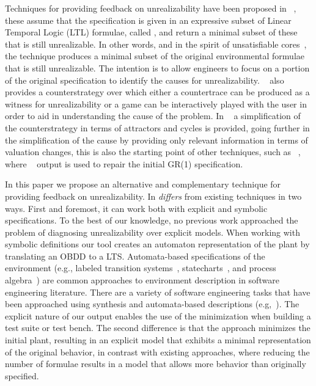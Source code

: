 Techniques for providing feedback on unrealizability have been proposed in ~\cite{DBLP:conf/fmcad/KonighoferHB09, DBLP:journals/scp/Schuppan12,DBLP:conf/fmcad/AlurMT13},
these assume that the specification is given in an expressive subset of Linear Temporal Logic (LTL) formulae, called \gr, and return a minimal subset of these that is still unrealizable. In other words, and in the spirit of unsatisfiable cores~\cite{Torlak:2008}, the technique produces a minimal subset of the original environmental formulae that is still unrealizable. The intention is to allow engineers to focus on a portion of the original specification to identify the causes for unrealizability. ~\cite{DBLP:conf/fmcad/KonighoferHB09} also provides a counterstrategy over which either a countertrace can be produced as a witness for unrealizability or a game can be interactively played with the user in order to aid in understanding the cause of the problem. In ~\cite{DBLP:conf/sigsoft/KuventMR17} a simplification of the counterstrategy in terms of attractors and cycles is provided, going further in the simplification of the cause by providing only relevant information in terms of valuation changes, this is also the starting point of other techniques, such as ~\cite{maoz2019symbolic}, where ~\cite{DBLP:conf/sigsoft/KuventMR17} output is used to repair the initial GR(1) specification.

In this paper we propose an alternative and complementary technique for providing feedback on unrealizability. In \textit{differs} from existing techniques in two ways. First and foremost, it can work both with explicit and symbolic specifications. To the best of our knowledge, no previous work approached the problem of diagnosing unrealizability over explicit models.  When working with symbolic definitions our tool creates an automaton representation of the plant by translating an OBDD to a LTS. Automata-based specifications of the environment (e.g., labeled transition systems~\cite{Keller:1976}, statecharts~\cite{Harel:1987}, and process algebra~\cite{Milner:1982,Hoare:1983}) are common approaches to environment description in software engineering literature. There are a variety of software engineering tasks that have been approached using synthesis and automata-based descriptions (e.g,~\cite{Letier:2013:RMS,DIppolito:2013,Pistore:2004:PMW}). The explicit nature of our output enables the use of the minimization when building a test suite or test bench. The second difference is that the approach minimizes the initial plant, resulting in an explicit model that exhibits a minimal representation of the original behavior, in contrast with existing approaches, where reducing the number of formulae results in a model that allows more behavior than originally specified. 

